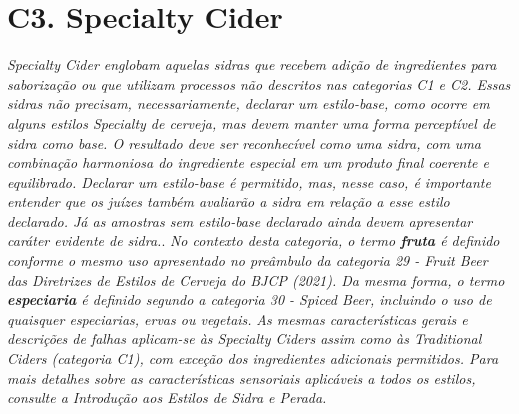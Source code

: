 \section*{C3. Specialty Cider}
\textit{Specialty Cider englobam aquelas sidras que recebem adição de ingredientes para saborização ou que utilizam processos não descritos nas categorias C1 e C2. Essas sidras não precisam, necessariamente, declarar um estilo-base, como ocorre em alguns estilos Specialty de cerveja, mas devem manter uma forma perceptível de sidra como base. O resultado deve ser reconhecível como uma sidra, com uma combinação harmoniosa do ingrediente especial em um produto final coerente e equilibrado. Declarar um estilo-base é permitido, mas, nesse caso, é importante entender que os juízes também avaliarão a sidra em relação a esse estilo declarado. Já as amostras sem estilo-base declarado ainda devem apresentar caráter evidente de sidra.}.
\textit{No contexto desta categoria, o termo \textbf{fruta} é definido conforme o mesmo uso apresentado no preâmbulo da categoria 29 - Fruit Beer das Diretrizes de Estilos de Cerveja do BJCP (2021). Da mesma forma, o termo \textbf{especiaria} é definido segundo a categoria 30 - Spiced Beer, incluindo o uso de quaisquer especiarias, ervas ou vegetais.}
\textit{As mesmas características gerais e descrições de falhas aplicam-se às Specialty Ciders assim como às Traditional Ciders (categoria C1), com exceção dos ingredientes adicionais permitidos. Para mais detalhes sobre as características sensoriais aplicáveis a todos os estilos, consulte a Introdução aos Estilos de Sidra e Perada.}